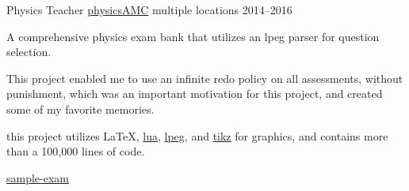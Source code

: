 \begin{cventries}


  \cventry
    {Physics Teacher} %
    {\href{https://github.com/jphafner/physicsAMC}{physicsAMC}}{}
    {multiple locations} {2014--2016}
    {
    \begin{cvitems}
        \item {A comprehensive physics exam bank that utilizes an lpeg parser for question selection.}
        \item {This project enabled me to use an infinite redo policy on all assessments, without punishment, which was an important motivation for this project, and created some of my favorite memories.}
        \item {this project utilizes \LaTeX, \href{lua.org}{lua}, \href{http://www.inf.puc-rio.br/~roberto/lpeg/}{lpeg}, and \href{http://www.texample.net/tikz/}{tikz} for graphics, and contains more than a 100,000 lines of code.}
        \item { \href{https://github.com/jphafner/physicsAMC/blob/mc-project/kinematics-exam/sample-exam.pdf}{sample-exam}}
    \end{cvitems}
    }
\end{cventries}

